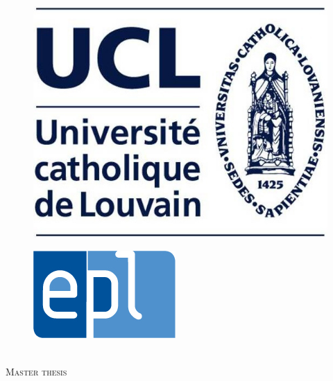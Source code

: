\documentclass[11pt, a4paper, oneside]{Packages/Thesis}
\begin{document}
\begin{titlepage}
\begin{center}

\textsc{\LARGE \univname}\\[0.1cm] %
\textsc{\large \facname\\\deptname}\\[1cm] %

\begin{minipage}{\linewidth}
	\centering
	\begin{minipage}{0.45\linewidth}
		\begin{figure}[H]
			\includegraphics[width=.4\linewidth, left]{Pictures/UCL/ucl.jpg}
		\end{figure}
	\end{minipage}
	\hspace{0.05\linewidth}
	\begin{minipage}{0.45\linewidth}
		\begin{figure}[H]
			\includegraphics[width=.5\linewidth, right]{Pictures/UCL/epl.jpg}
		\end{figure}
	\end{minipage}
\end{minipage}\\[1cm]

\textsc{\Large Master thesis}\\[1cm] %

\HRule \\[0.4cm] %
{\huge \bfseries \ttitle}\\[0.4cm] %
\HRule \\[1.5cm] %
 

\end{center}
\end{titlepage}
\end{document}
